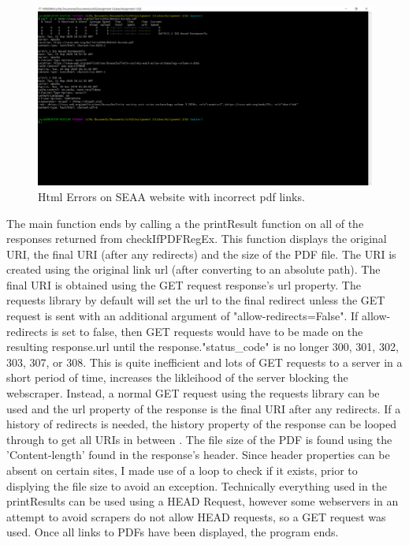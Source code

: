 \documentclass[12pt]{article}
\begin{document}
\begin{figure}[H]
    \centering
    \includegraphics[trim=0 60 10 20, clip, width=\textwidth] {Q3/seaaBadHTML_curl.png}
    \caption{Html Errors on SEAA website with incorrect pdf links. }
    \label{fig:q3SEAA_badHTML_curl}
\end{figure}


The main function ends by calling a the printResult function on all of the responses returned from checkIfPDFRegEx. This function displays the original URI, the final URI (after any redirects) and the size of the PDF file. The URI is created using the original link url (after converting to an absolute path). The final URI is obtained using the GET request response's url property. The requests library by default will set the url to the final redirect unless the GET request is sent with an additional argument of "allow-redirects=False". If allow-redirects is set to false, then GET requests would have to be made on the resulting response.url until the response."status\_code" is no longer 300, 301, 302, 303, 307, or 308. This is quite inefficient and lots of GET requests to a server in a short period of time, increases the likleihood of the server blocking the webscraper. Instead, a normal GET request using the requests library can be used and the url property of the response is the final URI after any redirects. If a history of redirects is needed, the history property of the response can be looped through to get all URIs in between \cite{stackOverflowRedirects}. The file size of the PDF is found using the 'Content-length'  found in the response's header.  Since header properties can be absent on certain sites, I made use of a loop to check if it exists, prior to displying the file size to avoid an exception. Technically everything used in the printResults  can be used using a HEAD Request, however some webservers in an attempt to avoid scrapers do not allow HEAD requests, so a GET request was used. Once all links to PDFs have been displayed, the program ends. 
\end{document}
